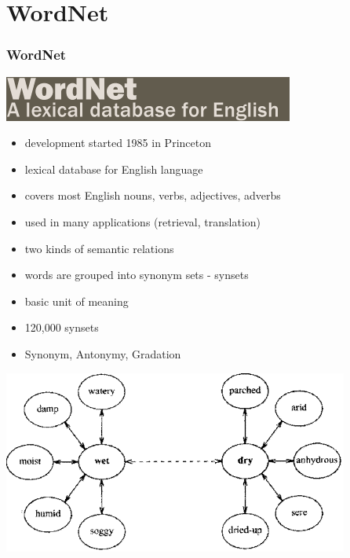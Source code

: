\section{WordNet}
\begin{frame}
\frametitle{WordNet}
\includegraphics[scale=0.35]{img/wordnet_logo.png}
\begin{itemize}
\item development started 1985 in Princeton
\item lexical database for English language
\item covers most English nouns, verbs, adjectives, adverbs
\item used in many applications (retrieval, translation)
\item two kinds of semantic relations
\end{itemize}
\end{frame}

\begin{frame}
\begin{itemize}
\frametitle{Synsets - Lexical (word-word) relation}
\item words are grouped into synonym sets - synsets
\item basic unit of meaning
\item 120,000 synsets
\item Synonym, Antonymy, Gradation
\end{itemize}
\includegraphics[scale=0.55]{img/wordnet-syn.png}
\end{frame}

